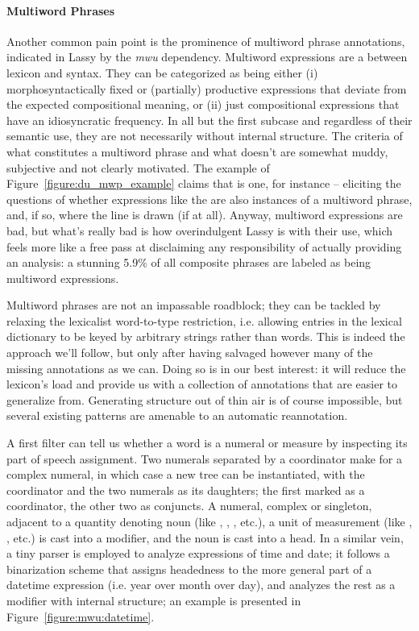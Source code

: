 \paragraph{Multiword Phrases}
Another common pain point is the prominence of multiword phrase annotations, indicated in Lassy by the \textit{mwu} dependency.
Multiword expressions are a  between lexicon and syntax.
They can be categorized as being either (i) morphosyntactically fixed or (partially) productive expressions that deviate from the expected compositional meaning, or (ii) just compositional expressions that have an idiosyncratic frequency.
In all but the first subcase and regardless of their semantic use, they are not necessarily without internal structure.
The criteria of what constitutes a multiword phrase and what doesn't are somewhat muddy, subjective and not clearly motivated.
The example of Figure~\ref{figure:du_mwp_example} claims that  is one, for instance -- eliciting the questions of whether expressions like the  are also instances of a multiword phrase, and, if so, where the line is drawn (if at all).
Anyway, multiword expressions are bad, but what's really bad is how overindulgent Lassy is with their use, which feels more like a free pass at disclaiming any responsibility of actually providing an analysis: a stunning 5.9\% of all composite phrases are labeled as being multiword expressions.

Multiword phrases are not an impassable roadblock; they can be tackled by relaxing the lexicalist word-to-type restriction, i.e. allowing entries in the lexical dictionary to be keyed by arbitrary strings rather than words.
This is indeed the approach we'll follow, but only after having salvaged however many of the missing annotations as we can.
Doing so is in our best interest: it will reduce the lexicon's load and provide us with a collection of annotations that are easier to generalize from.
Generating structure out of thin air is of course impossible, but several existing patterns are amenable to an automatic reannotation.

A first filter can tell us whether a word is a numeral or measure by inspecting its part of speech assignment.
Two numerals separated by a coordinator make for a complex numeral, in which case a new tree can be instantiated, with the coordinator and the two numerals as its daughters; the first marked as a coordinator, the other two as conjuncts.
A numeral, complex or singleton, adjacent to a quantity denoting noun (like , , , etc.), a unit of measurement (like , , etc.) is cast into a modifier, and the noun is cast into a head.
In a similar vein, a tiny parser is employed to analyze expressions of time and date; it follows a binarization scheme that assigns headedness to the more general part of a datetime expression (i.e. year over month over day), and analyzes the rest as a modifier with internal structure; an example is presented in Figure~\ref{figure:mwu:datetime}.

